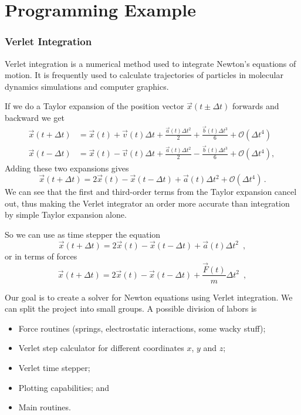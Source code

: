 \section[Example]{Programming Example}
\begin{frame}[allowframebreaks]
    \frametitle{Verlet Integration}
    
Verlet integration is a numerical method used to integrate Newton's equations of motion. It is frequently used to calculate trajectories of particles in molecular dynamics simulations and computer graphics.

If we do a Taylor expansion of the position vector $\vec{x}(t\pm\Delta t)$ forwards and backward we get
\begin{align*}
\vec{x}(t + \Delta t)
&= \vec{x}(t) + \vec{v}(t)\Delta t + \frac{\vec{a}(t) \Delta t^2}{2}
+ \frac{\vec{b}(t) \Delta t^3}{6} + \mathcal{O}(\Delta t^4)\\
\vec{x}(t - \Delta t)
&= \vec{x}(t) - \vec{v}(t)\Delta t + \frac{\vec{a}(t) \Delta t^2}{2}
- \frac{\vec{b}(t) \Delta t^3}{6} + \mathcal{O}(\Delta t^4), \,
\end{align*}
Adding these two expansions gives
\[\vec{x}(t + \Delta t) = 2\vec{x}(t) - \vec{x}(t - \Delta t) + \vec{a}(t) \Delta t^2 + \mathcal{O}(\Delta t^4)\, .\]
We can see that the first and third-order terms from the Taylor expansion cancel out, thus making the Verlet integrator an order more accurate than integration by simple Taylor expansion alone.

So we can use as time stepper the equation
\[\boxed{\vec{x}(t + \Delta t) = 2\vec{x}(t) - \vec{x}(t - \Delta t) + \vec{a}(t) \Delta t^2} \enspace ,\]
or in terms of forces
\[\boxed{\vec{x}(t + \Delta t) = 2\vec{x}(t) - \vec{x}(t - \Delta t) + \frac{\vec{F}(t)}{m} \Delta t^2} \enspace ,\]

Our goal is to create a solver for Newton equations using Verlet integration. We can split the project into small groups. A possible division of labors is
\begin{itemize}
\item Force routines (springs, electrostatic interactions, some wacky stuff);

\item Verlet step calculator for different coordinates $x$, $y$ and $z$;

\item Verlet time stepper;

\item Plotting capabilities; and

\item Main routines.
\end{itemize}
    
\end{frame}

